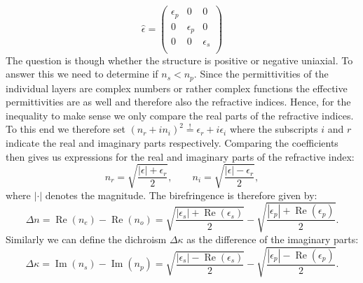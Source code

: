 \begin{equation}
    \label{eq:rytov_tensor}
    \hat{\epsilon} = 
    \begin{pmatrix}
        \epsilon_{p} & 0 & 0 \\
        0 & \epsilon_{p} & 0 \\
        0 & 0 & \epsilon_{s} \\
    \end{pmatrix}
\end{equation}
The question is though whether the structure is positive or negative uniaxial. To answer this we need to determine if $n_{s} < n_{p}$. Since the permittivities of the individual layers are complex numbers or rather complex functions the effective permittivities are as well and therefore also the refractive indices. Hence, for the inequality to make sense we only compare the real parts of the refractive indices. To this end we therefore set $(n_r+in_i)^2 \overset{!}{=} \epsilon_r + i\epsilon_i$ where the subscripts $i$ and $r$ indicate the real and imaginary parts respectively. Comparing the coefficients then gives us expressions for the real and imaginary parts of the refractive index:
\begin{equation}
    n_r = \sqrt{\frac{|\epsilon|+\epsilon_r}{2}}, 
    \qquad 
    n_i = \sqrt{\frac{|\epsilon|-\epsilon_r}{2}},
\end{equation}
where $|\cdot|$ denotes the magnitude. The birefringence is therefore given by:
\begin{equation}
    \label{eq:form_bf}
    \Delta n = \operatorname{Re}(n_e) - \operatorname{Re}(n_o) = \sqrt{\frac{|\epsilon_s|+\operatorname{Re}(\epsilon_s)}{2}} - \sqrt{\frac{|\epsilon_p|+\operatorname{Re}(\epsilon_p)}{2}}.
\end{equation}
Similarly we can define the dichroism $\Delta \kappa$ as the difference of the imaginary parts:
\begin{equation}
    \Delta \kappa = \operatorname{Im}(n_s) - \operatorname{Im}(n_p) = \sqrt{\frac{|\epsilon_s|-\operatorname{Re}(\epsilon_s)}{2}} - \sqrt{\frac{|\epsilon_p|-\operatorname{Re}(\epsilon_p)}{2}}.
\end{equation}

